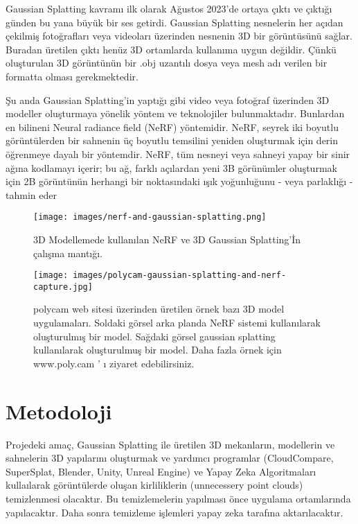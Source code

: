 \documentclass[12pt, a4paper]{article}
\begin{document}
	\bigskip
	
	Gaussian Splatting kavramı ilk olarak Ağustos 2023'de ortaya çıktı ve çıktığı günden bu yana büyük bir ses getirdi. Gaussian Splatting nesnelerin her açıdan çekilmiş fotoğrafları veya videoları üzerinden nesnenin 3D bir görüntüsünü sağlar. Buradan üretilen çıktı henüz 3D ortamlarda kullanıma uygun değildir. Çünkü oluşturulan 3D görüntünün bir .obj uzantılı dosya veya mesh adı verilen bir formatta olması gerekmektedir.
	
	\bigskip
	
	Şu anda Gaussian Splatting'in yaptığı gibi video veya fotoğraf üzerinden 3D modeller oluşturmaya yönelik yöntem ve teknolojiler bulunmaktadır.
	Bunlardan en bilineni Neural radiance field (NeRF) yöntemidir. NeRF, seyrek iki boyutlu görüntülerden bir sahnenin üç boyutlu temsilini yeniden oluşturmak için derin öğrenmeye dayalı bir yöntemdir. NeRF, tüm nesneyi veya sahneyi yapay bir sinir ağına kodlamayı içerir; bu ağ, farklı açılardan yeni 3B görünümler oluşturmak için 2B görüntünün herhangi bir noktasındaki ışık yoğunluğunu - veya parlaklığı - tahmin eder  \cite{NeRF} \cite{what-is-nerf}
	
	
	
	\bigskip
	\begin{figure}[h]	
		\centering
		\texttt{[image: images/nerf-and-gaussian-splatting.png]}
		\label{Differences between Gaussian Splatting and NeRF}
		\caption{3D Modellemede kullanılan NeRF ve 3D Gaussian Splatting'İn çalışma mantığı.}
	\end{figure}
	
	\begin{figure}[!h]	
		\centering
		\texttt{[image: images/polycam-gaussian-splatting-and-nerf-capture.jpg]}
		\label{Gaussian Splatting and NeRF examples}
		\caption{polycam web sitesi üzerinden üretilen örnek bazı 3D model uygulamaları. Soldaki görsel arka planda NeRF sistemi kullanılarak oluşturulmış bir model. Sağdaki görsel gaussian splatting kullanılarak oluşturulmuş bir model. Daha fazla örnek için www.poly.cam ' ı ziyaret edebilirsiniz. \cite{polycam-exp}}
	\end{figure}
	
	
	\section{Metodoloji}
	
	Projedeki amaç, Gaussian Splatting ile üretilen 3D mekanların, modellerin ve sahnelerin 3D yapılarını oluşturmak ve yardımcı programlar (CloudCompare, SuperSplat, Blender, Unity, Unreal Engine) ve Yapay Zeka Algoritmaları kullaılarak görüntülerde oluşan kirliliklerin (unnecessery point clouds) temizlenmesi olacaktır. Bu temizlemelerin yapılması önce uygulama ortamlarında yapılacaktır. Daha sonra temizleme işlemleri yapay zeka tarafına aktarılacaktır.
	
\end{document}
